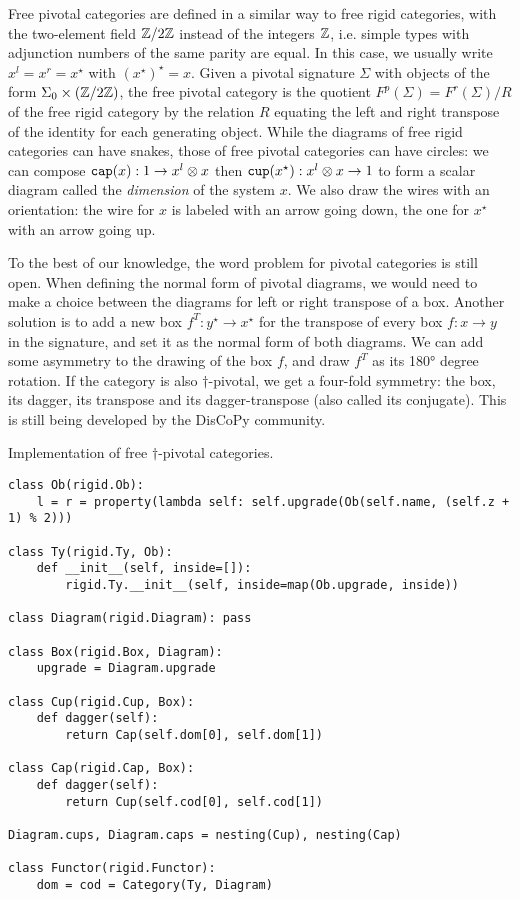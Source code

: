 Free pivotal categories are defined in a similar way to free rigid categories, with the two-element field $\mathbb{Z} / 2 \mathbb{Z}$ instead of the integers $\mathbb{Z}$, i.e. simple types with adjunction numbers of the same parity are equal.
In this case, we usually write $x^l = x^r = x^\star$ with $(x^\star)^\star = x$.
Given a pivotal signature $\Sigma$ with objects of the form $\Sigma_0 \times (\mathbb{Z} / 2 \mathbb{Z})$, the free pivotal category is the quotient $F^p(\Sigma) = F^r(\Sigma) / R$ of the free rigid category by the relation $R$ equating the left and right transpose of the identity for each generating object.
While the diagrams of free rigid categories can have snakes, those of free pivotal categories can have circles: we can compose $\mathtt{cap}(x) : 1 \to x^l \otimes x$ then $\mathtt{cup}(x^\star) : x^l \otimes x \to 1$ to form a scalar diagram called the \emph{dimension} of the system $x$.
We also draw the wires with an orientation: the wire for $x$ is labeled with an arrow going down, the one for $x^\star$ with an arrow going up.

To the best of our knowledge, the word problem for pivotal categories is still open.
When defining the normal form of pivotal diagrams, we would need to make a choice between the diagrams for left or right transpose of a box.
Another solution is to add a new box $f^T : y^\star \to x^\star$ for the transpose of every box $f : x \to y$ in the signature, and set it as the normal form of both diagrams.
We can add some asymmetry to the drawing of the box $f$, and draw $f^T$ as its 180° degree rotation.
If the category is also $\dagger$-pivotal, we get a four-fold symmetry: the box, its dagger, its transpose and its dagger-transpose (also called its conjugate).
This is still being developed by the DisCoPy community.

\begin{python}
{\normalfont Implementation of free $\dagger$-pivotal categories.}

\begin{verbatim}
class Ob(rigid.Ob):
    l = r = property(lambda self: self.upgrade(Ob(self.name, (self.z + 1) % 2)))

class Ty(rigid.Ty, Ob):
    def __init__(self, inside=[]):
        rigid.Ty.__init__(self, inside=map(Ob.upgrade, inside))

class Diagram(rigid.Diagram): pass

class Box(rigid.Box, Diagram):
    upgrade = Diagram.upgrade

class Cup(rigid.Cup, Box):
    def dagger(self):
        return Cap(self.dom[0], self.dom[1])

class Cap(rigid.Cap, Box):
    def dagger(self):
        return Cup(self.cod[0], self.cod[1])

Diagram.cups, Diagram.caps = nesting(Cup), nesting(Cap)

class Functor(rigid.Functor):
    dom = cod = Category(Ty, Diagram)
\end{verbatim}
\end{python}
